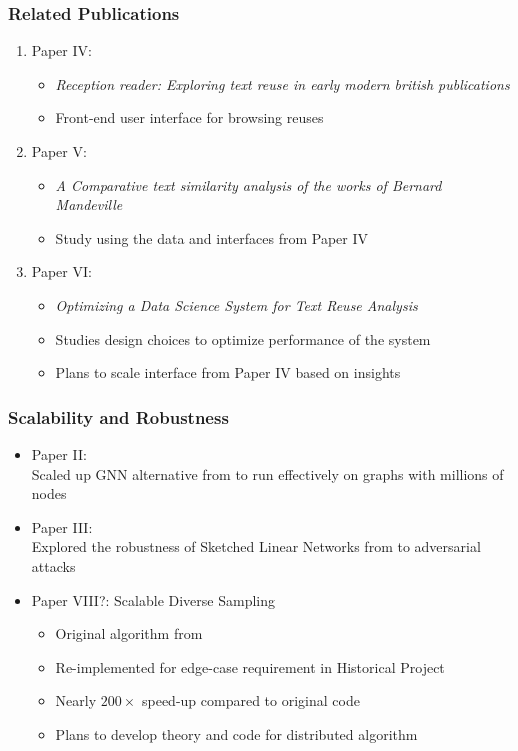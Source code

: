\documentclass[pdf]{beamer}
\begin{document}
\begin{frame}
    \frametitle{Related Publications}

    \begin{enumerate}
        \item Paper IV: \citet{Rosson-2023}
        \begin{itemize}
            \item \emph{Reception reader: Exploring text reuse in early modern british publications}
            \item Front-end user interface for browsing reuses
        \end{itemize}
        \item Paper V: \citet{des6}
        \begin{itemize}
            \item \emph{A Comparative text similarity analysis of the works of Bernard Mandeville}
            \item Study using the data and interfaces from Paper IV
        \end{itemize}
        \item Paper VI: \citet{mahadevan2024optimizing}
        \begin{itemize}
            \item \emph{Optimizing a Data Science System for Text Reuse Analysis}
            \item Studies design choices to optimize performance of the system
            \item Plans to scale interface from Paper IV based on insights
        \end{itemize}
    \end{enumerate}


\end{frame}
\begin{frame}
    \frametitle{Scalability and Robustness}
    \begin{itemize}
        \item Paper II: \citet{merchant2022JANE}\\
        Scaled up GNN alternative from \citet{merchant2022JANEorig} to run effectively on graphs with millions of nodes
        \item Paper III: \citet{10.1145/3511808.3557687}\\
        Explored the robustness of Sketched Linear Networks from \citet{tai2018sketch} to adversarial attacks
        \item Paper VIII?: Scalable Diverse Sampling
        \begin{itemize}
            \item Original algorithm from \citet{wang2023fmmd}
            \item Re-implemented for edge-case requirement in Historical Project
            \item Nearly $200\times$ speed-up compared to original code
            \item Plans to develop theory and code for distributed algorithm 
        \end{itemize}
    \end{itemize}
\end{frame}
\end{document}
